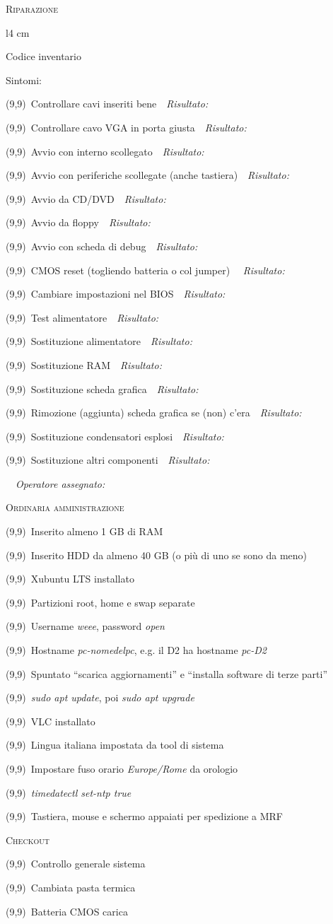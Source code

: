 \documentclass[a4paper,11pt,twoside]{article}
\newcommand{\rulespace}[1]{\ \ \textit{\small #1} \hrulefill\par}
\renewcommand{\r}{\rulespace{Risultato:}}
\renewcommand{\c}{\framebox(9,9){}\, }
\newcommand{\ci}{\hspace{1cm}\c} %
\begin{document}
\thispagestyle{empty}
{\Large\textsc{Riparazione}}\par
\begin{wrapfigure}{l}{4 cm}
	\vspace{-0.5cm}
	\begin{framed}
		\begin{centering}
		{\footnotesize Codice inventario\par}
		\vspace{2.4cm}
		\end{centering}		
	\end{framed}
	\vspace{-1.4cm}
\end{wrapfigure}
Sintomi: \hrulefill\par
\hrulefill\par
\c Controllare cavi inseriti bene\r
\c Controllare cavo VGA in porta giusta\r
\c Avvio con interno scollegato\r
\c Avvio con periferiche scollegate (anche tastiera)\r
\c Avvio da CD/DVD\r
\c Avvio da floppy\r
\c Avvio con scheda di debug\r
\c CMOS reset (togliendo batteria o col jumper) \r
\c Cambiare impostazioni nel BIOS\r
\c Test alimentatore\r
\c Sostituzione alimentatore\r
\c Sostituzione RAM\r
\c Sostituzione scheda grafica\r
\c Rimozione (aggiunta) scheda grafica se (non) c'era\r
\c Sostituzione condensatori esplosi\r
\c Sostituzione altri componenti\r
\rulespace{Operatore assegnato:}
{\Large\textsc{Ordinaria amministrazione}}\par
\c Inserito almeno 1 GB di RAM\par
\c Inserito HDD da almeno 40 GB (o più di uno se sono da meno)\par
\c Xubuntu LTS installato\par
\ci Partizioni root, home e swap separate\par
\ci Username \textit{weee}, password \textit{open}\par
\ci Hostname \textit{pc-nomedelpc}, e.g. il D2 ha hostname \textit{pc-D2}\par
\ci Spuntato ``scarica aggiornamenti'' e ``installa software di terze parti''\par
\ci \textit{sudo apt update}, poi \textit{sudo apt upgrade}\par
\ci VLC installato\par
\ci Lingua italiana impostata da tool di sistema\par
\ci Impostare fuso orario \textit{Europe/Rome} da orologio\par
\ci \textit{timedatectl set-ntp true}\par
\c Tastiera, mouse e schermo appaiati per spedizione a MRF\par
{\Large\textsc{Checkout}}\par
\c Controllo generale sistema\par
\c Cambiata pasta termica\par
\c Batteria CMOS carica\par
\end{document}
